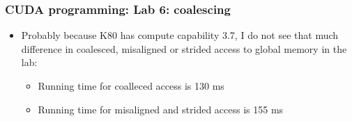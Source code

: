 \begin{frame}[fragile]
  \frametitle{CUDA programming: Lab 6: coalescing}
\begin{itemize}
\item Probably because K80 has compute capability 3.7, 
  I do not see that much difference in coalesced, misaligned or strided access to global memory in the lab:
  \begin{itemize}
  \item Running time for coalleced access is 130 ms
  \item Running time for misaligned and strided access is 155 ms
  \end{itemize}
\end{itemize}
\end{frame}
